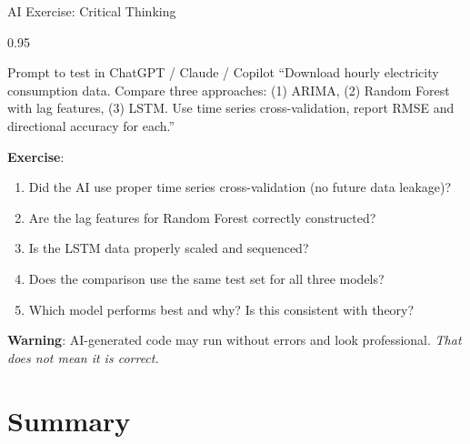 \documentclass[9pt, aspectratio=169, t]{beamer}
\begin{document}
\begin{frame}{AI Exercise: Critical Thinking}
    \begin{cminipage}{0.95\textwidth}
    \vspace{-0.3cm}
    \begin{block}{\footnotesize Prompt to test in ChatGPT / Claude / Copilot}
        {\footnotesize
        ``Download hourly electricity consumption data. Compare three approaches: (1) ARIMA, (2) Random Forest with lag features, (3) LSTM. Use time series cross-validation, report RMSE and directional accuracy for each.''
        }
    \end{block}
    \vspace{-2mm}
    {\footnotesize
    \textbf{Exercise}:
    \begin{enumerate}\setlength{\itemsep}{0pt}
        \item Did the AI use proper time series cross-validation (no future data leakage)?
        \item Are the lag features for Random Forest correctly constructed?
        \item Is the LSTM data properly scaled and sequenced?
        \item Does the comparison use the same test set for all three models?
        \item Which model performs best and why? Is this consistent with theory?
    \end{enumerate}
    }
    \vspace{-2mm}
    \begin{alertblock}{}
        {\footnotesize \textbf{Warning}: AI-generated code may run without errors and look professional. \textit{That does not mean it is correct.}}
    \end{alertblock}
    \end{cminipage}
\end{frame}

\section{Summary}
\end{document}
